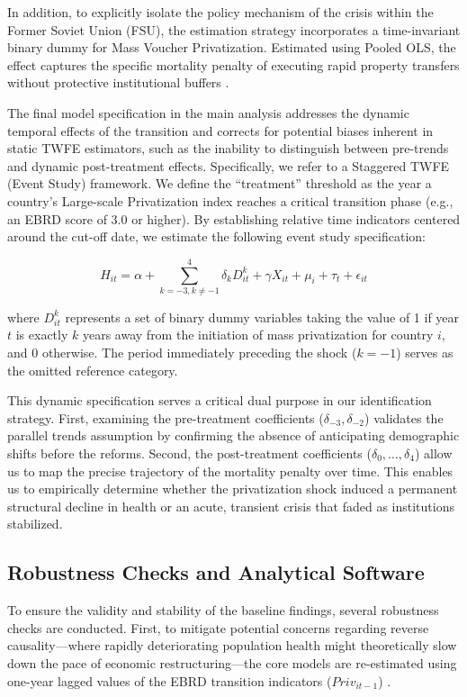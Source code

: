 \documentclass[12pt]{article}
\begin{document}
In addition, to explicitly isolate the policy mechanism of the crisis within the Former Soviet Union (FSU), the estimation strategy incorporates a time-invariant binary dummy for Mass Voucher Privatization. Estimated using Pooled OLS, the effect captures the specific mortality penalty of executing rapid property transfers without protective institutional buffers \citep{Hamm2012}.

The final model specification in the main analysis addresses the dynamic temporal effects of the transition and corrects for potential biases inherent in static TWFE estimators, such as the inability to distinguish between pre-trends and dynamic 
post-treatment effects. Specifically, we refer to a Staggered TWFE (Event Study) framework. We define the ``treatment'' threshold as the year a country's Large-scale Privatization index reaches 
a critical transition phase (e.g., an EBRD score of 3.0 or higher). By establishing relative time indicators centered around the cut-off date, we estimate the following event study specification:

$$H_{it} = \alpha + \sum_{k=-3, k \neq -1}^{4} \delta_k D_{it}^k + \gamma X_{it} + \mu_i + \tau_t + \epsilon_{it}$$

where $D_{it}^k$ represents a set of binary dummy variables taking the value of 1 if year $t$ is exactly $k$ years away from the initiation of mass privatization for country $i$, and 0 otherwise. 
The period immediately preceding the shock ($k = -1$) serves as the omitted reference category. 

This dynamic specification serves a critical dual purpose in our identification strategy. First, examining the pre-treatment coefficients ($\delta_{-3}, \delta_{-2}$) validates the parallel trends 
assumption by confirming the absence of anticipating demographic shifts before the reforms. Second, the post-treatment coefficients ($\delta_{0}, \dots, \delta_{4}$) allow us to map the precise trajectory 
of the mortality penalty over time. This enables us to empirically determine whether the privatization shock induced a permanent structural decline in health or an acute, transient crisis that faded as 
institutions stabilized.

\subsection{Robustness Checks and Analytical Software}

To ensure the validity and stability of the baseline findings, several robustness checks are conducted. First, to mitigate potential concerns regarding reverse causality—where rapidly deteriorating 
population health might theoretically slow down the pace of economic restructuring—the core models are re-estimated using one-year lagged values of the EBRD transition indicators ($Priv_{it-1}$) 
\citep{Earle2013, Gerry2012, Wooldridge2010}.
\end{document}
